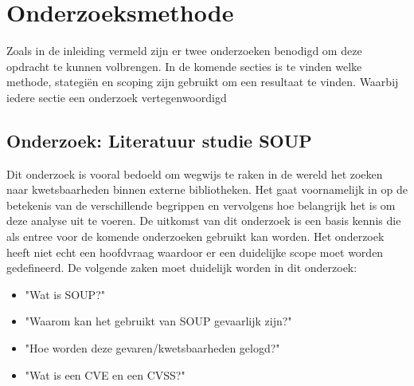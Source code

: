 
\chapter{Onderzoeksmethode}\label{ch:onderzoeksmethode} %

Zoals in de inleiding vermeld zijn er twee onderzoeken benodigd om deze opdracht te kunnen volbrengen.
In de komende secties is te vinden welke methode, stategiën en scoping zijn gebruikt om een resultaat te vinden.
Waarbij iedere sectie een onderzoek vertegenwoordigd


\section{Onderzoek: Literatuur studie SOUP}
Dit onderzoek is vooral bedoeld om wegwijs te raken in de wereld het zoeken naar kwetsbaarheden binnen externe bibliotheken.
Het gaat voornamelijk in op de betekenis van de verschillende begrippen en vervolgens hoe belangrijk het is om deze analyse uit te voeren.
De uitkomst van dit onderzoek is een basis kennis die als entree voor de komende onderzoeken gebruikt kan worden.
Het onderzoek heeft niet echt een hoofdvraag waardoor er een duidelijke scope moet worden gedefineerd.
De volgende zaken moet duidelijk worden in dit onderzoek:
\begin{itemize}
  \item "Wat is SOUP?"
  \item "Waarom kan het gebruikt van SOUP gevaarlijk zijn?"
  \item "Hoe worden deze gevaren/kwetsbaarheden gelogd?"
  \item "Wat is een CVE en een CVSS?"
\end{itemize}


